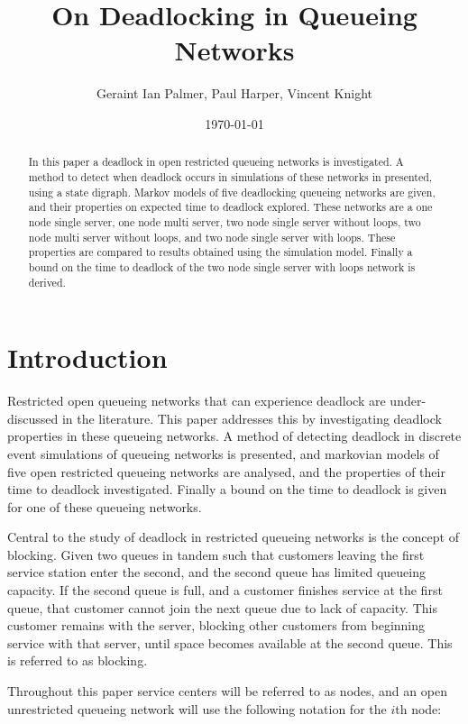 \documentclass{article}
\title{On Deadlocking in Queueing Networks}
\author{Geraint Ian Palmer, Paul Harper, Vincent Knight}
\date{\today}
\begin{document}
\onehalfspacing

\maketitle

\begin{abstract}
In this paper a deadlock in open restricted queueing networks is investigated.
A method to detect when deadlock occurs in simulations of these networks in presented, using a state digraph.
Markov models of five deadlocking queueing networks are given, and their properties on expected time to deadlock explored.
These networks are a one node single server, one node multi server, two node single server without loops, two node multi server without loops, and two node single server with loops.
These properties are compared to results obtained using the simulation model.
Finally a bound on the time to deadlock of the two node single server with loops network is derived.
\end{abstract}

\section{Introduction}

Restricted open queueing networks that can experience deadlock are under-discussed in the literature.
This paper addresses this by investigating deadlock properties in these queueing networks.
A method of detecting deadlock in discrete event simulations of queueing networks is presented, and markovian models of five open restricted queueing networks are analysed, and the properties of their time to deadlock investigated.
Finally a bound on the time to deadlock is given for one of these queueing networks.

Central to the study of deadlock in restricted queueing networks is the concept of blocking.
Given two queues in tandem such that customers leaving the first service station enter the second, and the second queue has limited queueing capacity.
If the second queue is full, and a customer finishes service at the first queue, that customer cannot join the next queue due to lack of capacity. This customer remains with the server, blocking other customers from beginning service with that server, until space becomes available at the second queue.
This is referred to as blocking.

Throughout this paper service centers will be referred to as nodes, and an open unrestricted queueing network will use the following notation for the $i$th node:
\end{document}
